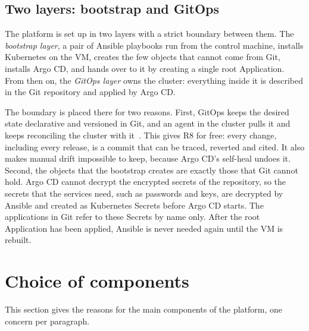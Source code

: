 \subsection{Two layers: bootstrap and GitOps}
\label{sec:DesignLayers}
The platform is set up in two layers with a strict boundary between them. The \emph{bootstrap layer}, a pair of Ansible playbooks run from the control machine, installs Kubernetes on the VM, creates the few objects that cannot come from Git, installs Argo CD, and hands over to it by creating a single root Application. From then on, the \emph{GitOps layer} owns the cluster: everything inside it is described in the Git repository and applied by Argo CD.

The boundary is placed there for two reasons. First, GitOps keeps the desired state declarative and versioned in Git, and an agent in the cluster pulls it and keeps reconciling the cluster with it~\cite{OpenGitOps}. This gives R8 for free: every change, including every release, is a commit that can be traced, reverted and cited. It also makes manual drift impossible to keep, because Argo CD's self-heal undoes it. Second, the objects that the bootstrap creates are exactly those that Git cannot hold. Argo CD cannot decrypt the encrypted secrets of the repository, so the secrets that the services need, such as passwords and keys, are decrypted by Ansible and created as Kubernetes Secrets before Argo CD starts. The applications in Git refer to these Secrets by name only. After the root Application has been applied, Ansible is never needed again until the VM is rebuilt.

\section{Choice of components}
\label{sec:DesignComponents}
This section gives the reasons for the main components of the platform, one concern per paragraph.

